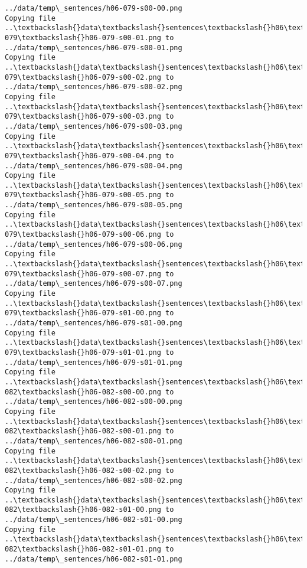 \documentclass[11pt]{article}
\begin{document}
\begin{Verbatim}[commandchars=\\\{\}]
../data/temp\_sentences/h06-079-s00-00.png
Copying file ..\textbackslash{}data\textbackslash{}sentences\textbackslash{}h06\textbackslash{}h06-079\textbackslash{}h06-079-s00-01.png to
../data/temp\_sentences/h06-079-s00-01.png
Copying file ..\textbackslash{}data\textbackslash{}sentences\textbackslash{}h06\textbackslash{}h06-079\textbackslash{}h06-079-s00-02.png to
../data/temp\_sentences/h06-079-s00-02.png
Copying file ..\textbackslash{}data\textbackslash{}sentences\textbackslash{}h06\textbackslash{}h06-079\textbackslash{}h06-079-s00-03.png to
../data/temp\_sentences/h06-079-s00-03.png
Copying file ..\textbackslash{}data\textbackslash{}sentences\textbackslash{}h06\textbackslash{}h06-079\textbackslash{}h06-079-s00-04.png to
../data/temp\_sentences/h06-079-s00-04.png
Copying file ..\textbackslash{}data\textbackslash{}sentences\textbackslash{}h06\textbackslash{}h06-079\textbackslash{}h06-079-s00-05.png to
../data/temp\_sentences/h06-079-s00-05.png
Copying file ..\textbackslash{}data\textbackslash{}sentences\textbackslash{}h06\textbackslash{}h06-079\textbackslash{}h06-079-s00-06.png to
../data/temp\_sentences/h06-079-s00-06.png
Copying file ..\textbackslash{}data\textbackslash{}sentences\textbackslash{}h06\textbackslash{}h06-079\textbackslash{}h06-079-s00-07.png to
../data/temp\_sentences/h06-079-s00-07.png
Copying file ..\textbackslash{}data\textbackslash{}sentences\textbackslash{}h06\textbackslash{}h06-079\textbackslash{}h06-079-s01-00.png to
../data/temp\_sentences/h06-079-s01-00.png
Copying file ..\textbackslash{}data\textbackslash{}sentences\textbackslash{}h06\textbackslash{}h06-079\textbackslash{}h06-079-s01-01.png to
../data/temp\_sentences/h06-079-s01-01.png
Copying file ..\textbackslash{}data\textbackslash{}sentences\textbackslash{}h06\textbackslash{}h06-082\textbackslash{}h06-082-s00-00.png to
../data/temp\_sentences/h06-082-s00-00.png
Copying file ..\textbackslash{}data\textbackslash{}sentences\textbackslash{}h06\textbackslash{}h06-082\textbackslash{}h06-082-s00-01.png to
../data/temp\_sentences/h06-082-s00-01.png
Copying file ..\textbackslash{}data\textbackslash{}sentences\textbackslash{}h06\textbackslash{}h06-082\textbackslash{}h06-082-s00-02.png to
../data/temp\_sentences/h06-082-s00-02.png
Copying file ..\textbackslash{}data\textbackslash{}sentences\textbackslash{}h06\textbackslash{}h06-082\textbackslash{}h06-082-s01-00.png to
../data/temp\_sentences/h06-082-s01-00.png
Copying file ..\textbackslash{}data\textbackslash{}sentences\textbackslash{}h06\textbackslash{}h06-082\textbackslash{}h06-082-s01-01.png to
../data/temp\_sentences/h06-082-s01-01.png

\end{Verbatim}
\end{document}
